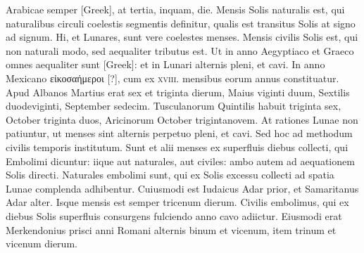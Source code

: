 Arabicae semper \textgreek{[Greek]},
at tertia, inquam, die.
Mensis Solis naturalis est,
qui naturalibus circuli coelestis segmentis definitur, qualis est transitus
Solis at signo ad signum.
Hi, et Lunares, sunt vere coelestes menses.
Mensis civilis Solis est, qui non naturali modo, sed aequaliter tributus
est.
Ut in anno Aegyptiaco et Graeco omnes aequaliter sunt
 \textgreek{[Greek]}: et in Lunari alternis pleni, et cavi.
In anno Mexicano \textgreek{εἰκοσαήμεροι [?]},
 cum ex \textsc{xviii}.
mensibus eorum annus constituatur.
Apud Albanos
Martius erat sex et triginta dierum, Maius viginti duum, Sextilis
duodeviginti, September sedecim.
Tusculanorum Quintilis habuit
triginta sex, October triginta duos, Aricinorum October trigintanovem.
At rationes Lunae non patiuntur, ut menses sint alternis
perpetuo pleni, et cavi.
Sed hoc ad methodum civilis temporis institutum.
Sunt et alii menses ex superfluis diebus collecti, qui Embolimi
dicuntur: iique aut naturales, aut civiles: ambo autem ad aequationem
Solis directi.
Naturales embolimi sunt, qui ex Solis excessu collecti
ad spatia Lunae complenda adhibentur.
Cuiusmodi est Iudaicus
Adar prior, et Samaritanus Adar alter.
Isque mensis est semper tricenum dierum.
Civilis embolimus, qui ex diebus Solis superfluis consurgens
fulciendo anno cavo adiictur.
Eiusmodi erat Merkendonius
prisci anni Romani alternis binum et vicenum, item trinum et vicenum
dierum.


